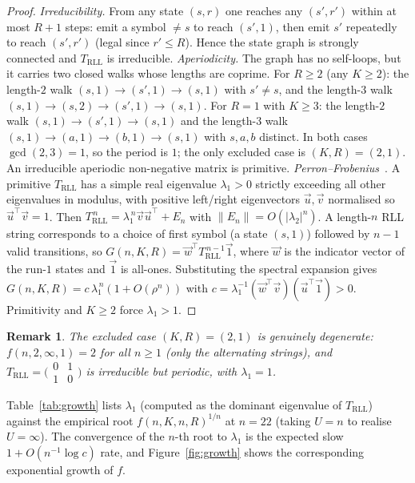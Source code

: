 \documentclass[a4paper,12pt]{article}
\newtheorem{remark}{Remark}
\begin{document}
\begin{proof}
\emph{Irreducibility.} From any state $(s,r)$ one reaches any $(s',r')$
within at most $R+1$ steps: emit a symbol $\ne s$ to reach $(s',1)$,
then emit $s'$ repeatedly to reach $(s',r')$ (legal since $r'\le R$).
Hence the state graph is strongly connected and $T_{\mathrm{RLL}}$ is
irreducible.
\emph{Aperiodicity.} The graph has no self-loops, but it carries two
closed walks whose lengths are coprime.  For $R\ge2$ (any $K\ge2$):
the length-$2$ walk $(s,1)\to(s',1)\to(s,1)$ with $s'\ne s$, and the
length-$3$ walk $(s,1)\to(s,2)\to(s',1)\to(s,1)$.  For $R=1$ with
$K\ge3$: the length-$2$ walk $(s,1)\to(s',1)\to(s,1)$ and the
length-$3$ walk $(s,1)\to(a,1)\to(b,1)\to(s,1)$ with $s,a,b$ distinct.
In both cases $\gcd(2,3)=1$, so the period is $1$; the only excluded
case is $(K,R)=(2,1)$.  An irreducible aperiodic non-negative matrix is
primitive.
\emph{Perron--Frobenius}~\cite{perron1907,lind1995}.  A primitive
$T_{\mathrm{RLL}}$ has a simple real eigenvalue $\lambda_1>0$ strictly
exceeding all other eigenvalues in modulus, with positive left/right
eigenvectors $\vec{u},\vec{v}$ normalised so $\vec{u}^\top\vec{v}=1$.
Then $T_{\mathrm{RLL}}^{\,n}=\lambda_1^{\,n}\vec{v}\vec{u}^\top+E_n$
with $\|E_n\|=O(|\lambda_2|^n)$.  A length-$n$ RLL string corresponds
to a choice of first symbol (a state $(s,1)$) followed by $n-1$ valid
transitions, so $G(n,K,R)=\vec{w}^\top T_{\mathrm{RLL}}^{\,n-1}\vec{1}$,
where $\vec{w}$ is the indicator vector of the run-$1$ states and
$\vec{1}$ is all-ones.  Substituting the spectral expansion gives
$G(n,K,R)=c\,\lambda_1^{\,n}(1+O(\rho^n))$ with
$c=\lambda_1^{-1}(\vec{w}^\top\vec{v})(\vec{u}^\top\vec{1})>0$.
Primitivity and $K\ge2$ force $\lambda_1>1$.
\end{proof}

\begin{remark}
The excluded case $(K,R)=(2,1)$ is genuinely degenerate:
$f(n,2,\infty,1)=2$ for all $n\ge1$ (only the alternating strings),
and $T_{\mathrm{RLL}}=\bigl(\begin{smallmatrix}0&1\\1&0\end{smallmatrix}\bigr)$
is irreducible but periodic, with $\lambda_1=1$.
\end{remark}

Table~\ref{tab:growth} lists $\lambda_1$ (computed as the dominant
eigenvalue of $T_{\mathrm{RLL}}$) against the empirical root
$f(n,K,n,R)^{1/n}$ at $n=22$ (taking $U=n$ to realise $U=\infty$).
The convergence of the $n$-th root to $\lambda_1$ is the expected slow
$1+O(n^{-1}\log c)$ rate, and Figure~\ref{fig:growth} shows the
corresponding exponential growth of $f$.
\end{document}
